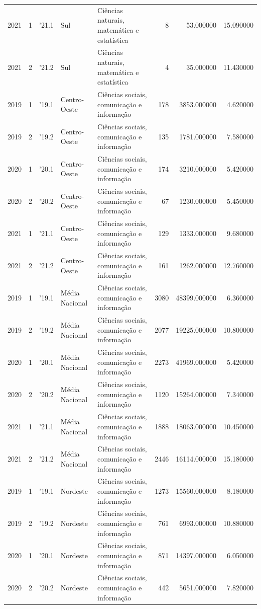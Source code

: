 \begin{longtable}{rrlllrrr}
2021 & 1 & '21.1 & Sul & Ciências naturais, matemática e estatística & 8 & 53.000000 & 15.090000 \\
2021 & 2 & '21.2 & Sul & Ciências naturais, matemática e estatística & 4 & 35.000000 & 11.430000 \\
2019 & 1 & '19.1 & Centro-Oeste & Ciências sociais, comunicação e informação & 178 & 3853.000000 & 4.620000 \\
2019 & 2 & '19.2 & Centro-Oeste & Ciências sociais, comunicação e informação & 135 & 1781.000000 & 7.580000 \\
2020 & 1 & '20.1 & Centro-Oeste & Ciências sociais, comunicação e informação & 174 & 3210.000000 & 5.420000 \\
2020 & 2 & '20.2 & Centro-Oeste & Ciências sociais, comunicação e informação & 67 & 1230.000000 & 5.450000 \\
2021 & 1 & '21.1 & Centro-Oeste & Ciências sociais, comunicação e informação & 129 & 1333.000000 & 9.680000 \\
2021 & 2 & '21.2 & Centro-Oeste & Ciências sociais, comunicação e informação & 161 & 1262.000000 & 12.760000 \\
2019 & 1 & '19.1 & Média Nacional & Ciências sociais, comunicação e informação & 3080 & 48399.000000 & 6.360000 \\
2019 & 2 & '19.2 & Média Nacional & Ciências sociais, comunicação e informação & 2077 & 19225.000000 & 10.800000 \\
2020 & 1 & '20.1 & Média Nacional & Ciências sociais, comunicação e informação & 2273 & 41969.000000 & 5.420000 \\
2020 & 2 & '20.2 & Média Nacional & Ciências sociais, comunicação e informação & 1120 & 15264.000000 & 7.340000 \\
2021 & 1 & '21.1 & Média Nacional & Ciências sociais, comunicação e informação & 1888 & 18063.000000 & 10.450000 \\
2021 & 2 & '21.2 & Média Nacional & Ciências sociais, comunicação e informação & 2446 & 16114.000000 & 15.180000 \\
2019 & 1 & '19.1 & Nordeste & Ciências sociais, comunicação e informação & 1273 & 15560.000000 & 8.180000 \\
2019 & 2 & '19.2 & Nordeste & Ciências sociais, comunicação e informação & 761 & 6993.000000 & 10.880000 \\
2020 & 1 & '20.1 & Nordeste & Ciências sociais, comunicação e informação & 871 & 14397.000000 & 6.050000 \\
2020 & 2 & '20.2 & Nordeste & Ciências sociais, comunicação e informação & 442 & 5651.000000 & 7.820000 \\

\end{longtable}

